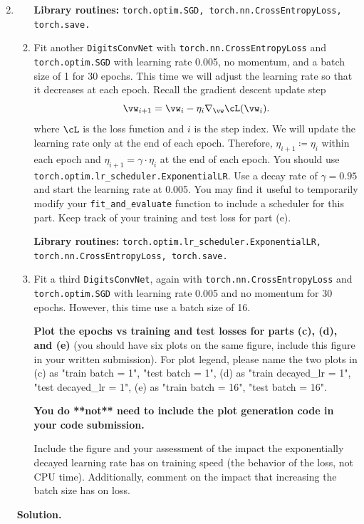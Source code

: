 \documentclass{article}
\theoremstyle{definition}
\theoremstyle{remark}
\newenvironment{Q}
{%
\clearpage
\item
}
{%
\phantom{s} %
\bigskip
\textbf{Solution.}
}
\begin{document}
\begin{enumerate}[font={\Large\bfseries},left=0pt]
\begin{Q}
\begin{enumerate}
            \textbf{Library routines:} \texttt{torch.optim.SGD, torch.nn.CrossEntropyLoss, torch.save.}
        \item Fit another \texttt{DigitsConvNet} with \texttt{torch.nn.CrossEntropyLoss} and \texttt{torch.optim.SGD} with learning rate 0.005, no momentum, and a batch size of 1 for 30 epochs.  This time we will adjust the learning rate so that it decreases
            at each epoch.  Recall the gradient descent update step
            $$\vw_{i+1} = \vw_i - \eta_i \nabla_{\vw} \cL(\vw_i).$$
            where $\cL$ is the loss function and $i$ is the step index. We will update the learning rate only at the end of each epoch. Therefore, $\eta_{i+1} \coloneqq \eta_i$ within each epoch and $\eta_{i+1} = \gamma \cdot \eta_i$ at the end of each epoch.  You should use             \texttt{torch.optim.lr\_scheduler.ExponentialLR}.  Use a decay rate of $\gamma=0.95$ and
            start the learning rate at 0.005. You may find it useful to temporarily modify your \texttt{fit\_and\_evaluate} function to include a scheduler for this part. Keep track of your training and test loss for part (e). 
            
            \textbf{Library routines:} \texttt{torch.optim.lr\_scheduler.ExponentialLR, torch.nn.CrossEntropyLoss, torch.save.}
        \item Fit a third \texttt{DigitsConvNet}, again with \texttt{torch.nn.CrossEntropyLoss} and \texttt{torch.optim.SGD}
            with learning rate 0.005 and no
            momentum for 30 epochs.  However, this time use a batch size of
            16. 
            
            \vspace{1.5mm}\textbf{Plot the epochs vs training and test losses for parts (c), (d), and (e)} (you should have six plots on the same figure, include this figure in your written submission).  For plot legend, please name the two plots in (c) as "train batch = 1", "test batch = 1", (d) as "train decayed\_lr = 1", "test decayed\_lr = 1", (e) as "train batch = 16", "test batch = 16".
            
            \vspace{1.5mm}\textbf{You do **not** need to include the plot generation code in your code submission.}
            
            \vspace{1.5mm}Include the figure and your assessment of the impact the exponentially decayed learning rate has
            on training speed (the behavior of the loss, not CPU time).  Additionally, comment on the
            impact that increasing the batch size has on loss. 
            

\end{enumerate}
\end{Q}
\end{enumerate}
\end{document}
